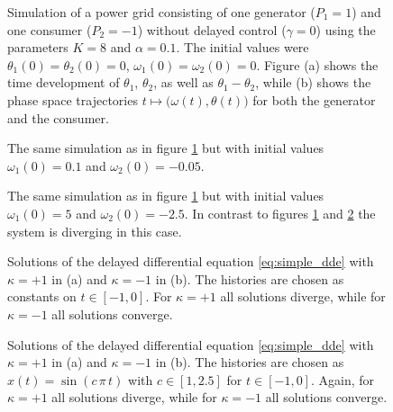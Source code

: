 \documentclass{scrartcl}
\begin{document}
\begin{figure}[h]
    \centering
    \caption{Simulation of a power grid consisting of one generator ($P_1
    = 1$) and one consumer ($P_2 = -1$) without delayed control ($\gamma
    = 0$) using the parameters $K=8$ and $\alpha=0.1$. The initial values
    were $\theta_1(0) = \theta_2(0) = 0$,
    $\omega_1(0) = \omega_2(0) = 0$. Figure (a) shows the time development of
    $\theta_1$, $\theta_2$, as well as $\theta_1 - \theta_2$, while (b) shows
    the phase space trajectories $t\mapsto \big(\omega(t), \theta(t)\big)$ for
    both the generator and the consumer.}
    \label{fig:B21_1}
\end{figure}

\begin{figure}[h]
    \centering
    \caption{The same simulation as in figure \ref{fig:B21_1} but with
    initial values $\omega_1(0) = 0.1$ and $\omega_2(0) = -0.05$.}
    \label{fig:B21_2}
\end{figure}

\begin{figure}[h]
    \centering
     \caption{The same simulation as in figure
        \ref{fig:B21_1} but with initial values $\omega_1(0) = 5$ and
        $\omega_2(0) = -2.5$. In contrast to figures \ref{fig:B21_1} and
        \ref{fig:B21_2} the system is diverging in this case.}
    \label{fig:B21_3}
\end{figure}

\begin{figure}[h]
    \centering
     \caption{Solutions of the delayed
        differential equation
        \eqref{eq:simple_dde} with $\kappa=+1$ in (a) and $\kappa=-1$ in
        (b). The histories are chosen as constants on $t\in[-1, 0]$.
        For $\kappa=+1$ all solutions diverge, while for $\kappa=-1$ all
        solutions converge.}
    \label{fig:B22_1}
\end{figure}

\begin{figure}[h]
    \centering
     \caption{Solutions of the delayed
        differential equation
        \eqref{eq:simple_dde} with $\kappa=+1$ in (a) and $\kappa=-1$ in
        (b). The histories are chosen as  $x(t) = \sin(c\,\pi\,t)$ with
        $c\in[1, 2.5]$ for $t\in[-1, 0]$. Again, for $\kappa=+1$ all solutions
        diverge, while for $\kappa=-1$ all solutions converge.}
    \label{fig:B22_2}
\end{figure}
\end{document}
